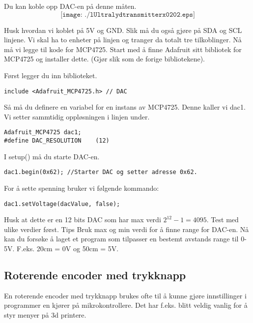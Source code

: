 \vskip 5pt 

Du kan koble opp DAC-en på denne måten. 
$$\texttt{[image: ./lUltralydtransmitterx0202.eps]}$$

\vskip 5pt 

Husk hvordan vi koblet på 5V og GND. Slik må du også gjøre på SDA og SCL linjene. Vi skal ha to enheter på linjen og tranger da totalt tre tilkoblinger. 
\vskip 5pt 
Nå må vi legge til kode for MCP4725. Start med å finne Adafruit sitt  bibliotek for MCP4725 og installer dette. (Gjør slik som de forige bibliotekene). 


\vskip 5pt 
Først legger du inn biblioteket.


\begin{lstlisting}[language=Arduino]
include <Adafruit_MCP4725.h> // DAC
\end{lstlisting}

\vskip 5pt 
Så må du definere en variabel for en instans av MCP4725. Denne kaller vi dac1. Vi setter sammtidig oppløsningen i linjen under. 
\begin{lstlisting}[language=Arduino]
Adafruit_MCP4725 dac1;
#define DAC_RESOLUTION    (12)
\end{lstlisting}

\vskip 5pt 

I setup() må du starte DAC-en. 

\begin{lstlisting}[language=Arduino]
dac1.begin(0x62); //Starter DAC og setter adresse 0x62. 
\end{lstlisting}

\vskip 5pt 
For å sette spenning bruker vi følgende kommando:

\begin{lstlisting}[language=Arduino]
dac1.setVoltage(dacValue, false);
\end{lstlisting}

\vskip 5pt 
Husk at dette er en 12 bits DAC som har max verdi $2^{12}-1=4095$. Test med ulike verdier først. Tips Bruk max og min verdi for å finne range for DAC-en.
\vskip 5pt 
Nå kan du forsøke å laget et program som tilpasser en bestemt avstands range til 0-5V. F.eks. 20cm = 0V og 50cm  = 5V. 


\vskip 5pt 

\subsection*{Roterende encoder med trykknapp}
En roterende encoder med trykknapp brukes ofte til å kunne gjøre innstillinger i programmer en kjører på mikrokontrollere. Det har f.eks. blitt veldig vanlig for å styr menyer på 3d printere. 

